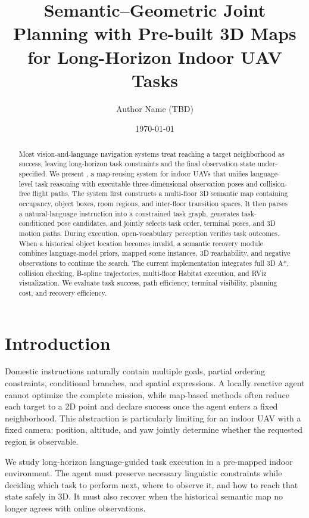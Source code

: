 \documentclass[11pt]{article}
\title{Semantic--Geometric Joint Planning with Pre-built 3D Maps for Long-Horizon Indoor UAV Tasks}
\author{Author Name (TBD)}
\date{\today}
\begin{document}
\maketitle

\begin{abstract}
Most vision-and-language navigation systems treat reaching a target neighborhood as success, leaving long-horizon task constraints and the final observation state under-specified. We present \systemname, a map-reusing system for indoor UAVs that unifies language-level task reasoning with executable three-dimensional observation poses and collision-free flight paths. The system first constructs a multi-floor 3D semantic map containing occupancy, object boxes, room regions, and inter-floor transition spaces. It then parses a natural-language instruction into a constrained task graph, generates task-conditioned pose candidates, and jointly selects task order, terminal poses, and 3D motion paths. During execution, open-vocabulary perception verifies task outcomes. When a historical object location becomes invalid, a semantic recovery module combines language-model priors, mapped scene instances, 3D reachability, and negative observations to continue the search. The current implementation integrates full 3D A*, collision checking, B-spline trajectories, multi-floor Habitat execution, and RViz visualization. We evaluate task success, path efficiency, terminal visibility, planning cost, and recovery efficiency.
\end{abstract}

\overviewfigure

\section{Introduction}
Domestic instructions naturally contain multiple goals, partial ordering constraints, conditional branches, and spatial expressions. A locally reactive agent cannot optimize the complete mission, while map-based methods often reduce each target to a 2D point and declare success once the agent enters a fixed neighborhood. This abstraction is particularly limiting for an indoor UAV with a fixed camera: position, altitude, and yaw jointly determine whether the requested region is observable.

We study long-horizon language-guided task execution in a pre-mapped indoor environment. The agent must preserve necessary linguistic constraints while deciding which task to perform next, where to observe it, and how to reach that state safely in 3D. It must also recover when the historical semantic map no longer agrees with online observations.
\end{document}
